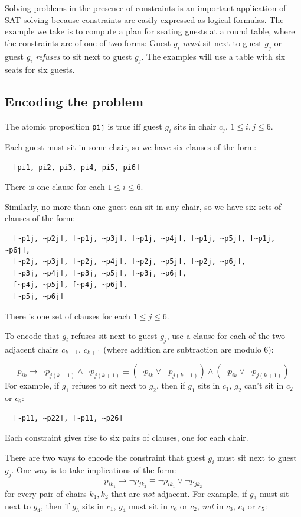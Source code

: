 \documentclass[11pt]{report}
\newcommand*{\p}[1]{\textup{\texttt{#1}}}
\newcommand*{\ngg}{\mathop{\neg}}
\begin{document}
Solving problems in the presence of constraints is an important
application of SAT solving because constraints are easily expressed as
logical formulas. The example we take is to compute a plan for seating
guests at a round table, where the constraints are of one of two forms:
Guest $g_i$ \emph{must} sit next to guest $g_j$ or guest $g_i$
\emph{refuses} to sit next to guest $g_j$. The examples will use a table
with six seats for six guests.

\subsection{Encoding the problem}

The atomic proposition \p{pij} is true iff guest $g_i$ sits in chair
$c_j$, $1 \leq i,j \leq 6$.

Each guest must sit in some chair, so we have six clauses of the form:
\begin{verbatim}
  [pi1, pi2, pi3, pi4, pi5, pi6]
\end{verbatim}
There is one clause for each $1 \leq i \leq 6$.

Similarly, no more than one guest can sit in any chair, so we have six
sets of clauses of the form:
\begin{verbatim}
  [~p1j, ~p2j], [~p1j, ~p3j], [~p1j, ~p4j], [~p1j, ~p5j], [~p1j, ~p6j], 
  [~p2j, ~p3j], [~p2j, ~p4j], [~p2j, ~p5j], [~p2j, ~p6j],  
  [~p3j, ~p4j], [~p3j, ~p5j], [~p3j, ~p6j], 
  [~p4j, ~p5j], [~p4j, ~p6j], 
  [~p5j, ~p6j]
\end{verbatim}
There is one set of clauses for each $1 \leq j \leq 6$.
 
To encode that $g_i$ refuses sit next to guest $g_j$, use a clause for
each of the two adjacent chairs $c_{k-1}$, $c_{k+1}$ (where addition are
subtraction are modulo 6):

\begin{displaymath}
p_{ik} \rightarrow \ngg p_{j(k-1)} \wedge \ngg p_{j(k+1)} \equiv
(\ngg p_{ik} \vee \ngg p_{j(k-1)} ) \wedge
(\ngg p_{ik} \vee \ngg p_{j(k+1)} ) 
\end{displaymath}
For example, if $g_1$  refuses to sit next to $g_2$, then if $g_1$ sits
in $c_1$, $g_2$ can't sit in $c_2$ or $c_6$:

\begin{verbatim}
  [~p11, ~p22], [~p11, ~p26]
\end{verbatim}
Each constraint gives rise to six pairs of clauses, one for each chair.

There are two ways to encode the constraint that guest $g_i$ must sit
next to guest $g_j$. One way is to take implications of the form:
\begin{displaymath}
p_{ik_{1}} \rightarrow \ngg p_{jk_{2}} \equiv
\ngg p_{ik_{1}} \vee \ngg p_{jk_{2}}
\end{displaymath}
for every pair of chairs $k_1, k_2$ that are \emph{not} adjacent. For
example, if $g_3$ must sit next to $g_4$, then if $g_3$ sits in $c_1$,
$g_4$ must sit in $c_6$ or $c_2$, \emph{not} in $c_3$, $c_4$ or $c_5$:
\end{document}

